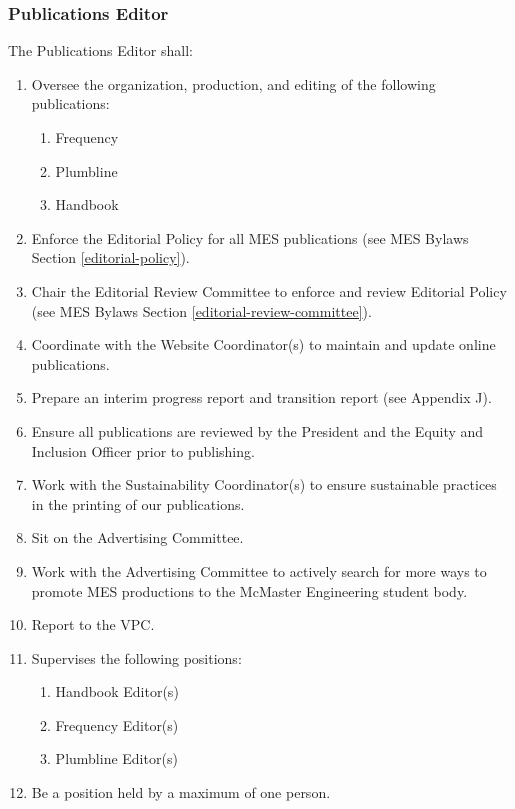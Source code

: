 \subsubsection{Publications Editor}
\label{publications-editor}
The Publications Editor shall:

\begin{enumerate}
 \item
  Oversee the organization, production, and editing of the following publications:

  \begin{enumerate}
   \item
    Frequency
   \item
    Plumbline
   \item
    Handbook
  \end{enumerate}
 \item
  Enforce the Editorial Policy for all MES publications (see MES Bylaws Section \ref{editorial-policy}).
 \item
  Chair the Editorial Review Committee to enforce and review Editorial Policy (see MES Bylaws Section \ref{editorial-review-committee}).
 \item
  Coordinate with the Website Coordinator(s) to maintain and update online publications.
 \item
  Prepare an interim progress report and transition report (see Appendix J). %
 \item
  Ensure all publications are reviewed by the President and the Equity and Inclusion Officer prior to publishing.
 \item
  Work with the Sustainability Coordinator(s) to ensure sustainable practices in the printing of our publications.
 \item
  Sit on the Advertising Committee.
 \item
  Work with the Advertising Committee to actively search for more ways to promote MES productions to the McMaster Engineering student body.
 \item
  Report to the VPC.
 \item
  Supervises the following positions:

  \begin{enumerate}
   \item
    Handbook Editor(s)
   \item
    Frequency Editor(s)
   \item
    Plumbline Editor(s)
  \end{enumerate}
 \item
  Be a position held by a maximum of one person.

\end{enumerate}


